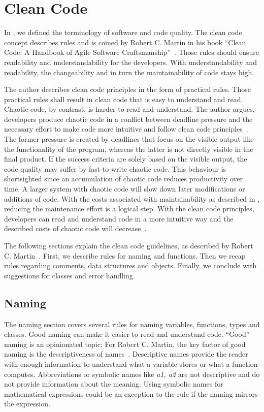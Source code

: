 \section{Clean Code}\label{sec:clean_code}
In , we defined the terminology of software and code quality. The clean code concept describes rules and is coined by Robert C. Martin in his book \enquote{Clean Code: A Handbook of Agile Software Craftsmanship}~\cite{martin_clean_2009}. Those rules should ensure readability and understandability for the developers. With understandability and readability, the changeability and in turn the maintainability of code stays high.   

The author describes clean code principles in the form of practical rules. Those practical rules shall result in clean code that is easy to understand and read. Chaotic code, by contrast, is harder to read and understand. The author argues, developers produce chaotic code in a conflict between deadline pressure and the necessary effort to make code more intuitive and follow clean code principles~\cite{martin_clean_2009}. The former pressure is created by deadlines that focus on the visible output like the functionality of the program, whereas the latter is not directly visible in the final product. If the success criteria are solely based on the visible output, the code quality may suffer by fast-to-write chaotic code. This behaviour is shortsighted since an accumulation of chaotic code reduces productivity over time. A larger system with chaotic code will slow down later modifications or additions of code. With the costs associated with maintainability as described in , reducing the maintenance effort is a logical step. With the clean code principles, developers can read and understand code in a more intuitive way and the described costs of chaotic code will decrease~\cite{martin_clean_2009}.

The following sections explain the clean code guidelines, as described by Robert C. Martin~\cite{martin_clean_2009}. First, we describe rules for naming and functions. Then we recap rules regarding comments, data structures and objects. Finally, we conclude with suggestions for classes and error handling.

\subsection{Naming}\label{sec:naming}
The naming section covers several rules for naming variables, functions, types and classes.
Good naming can make it easier to read and understand code. \enquote{Good} naming is an opinionated topic; For Robert C. Martin, the key factor of good naming is the descriptiveness of names~\cite{martin_clean_2009}. Descriptive names provide the reader with enough information to understand what a variable stores or what a function computes. Abbreviations or symbolic names like \textit{a1, a2} are not descriptive and do not provide information about the meaning. Using symbolic names for mathematical expressions could be an exception to the rule if the naming mirrors the expression.


